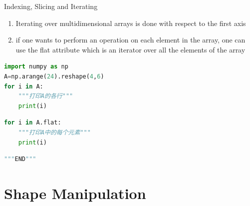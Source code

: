 \documentclass[ignorenonframetext,11pt,xcolor=dvipsnames,hyperref={colorlinks,allcolors=.,urlcolor=blue, citecolor=violet, bookmarksdepth=4},aspectratio=1610]{beamer}
\providecommand{\tightlist}{%
  \setlength{\itemsep}{0pt}\setlength{\parskip}{0pt}}
\begin{document}
\begin{frame}[fragile]{Indexing, Slicing and Iterating}
\protect\hypertarget{indexing-slicing-and-iterating-4}{}

\begin{enumerate}
\tightlist
\item
  Iterating over multidimensional arrays is done with respect to the
  first axis
\item
  if one wants to perform an operation on each element in the array, one
  can use the flat attribute which is an iterator over all the elements
  of the array
\end{enumerate}

\begin{lstlisting}[language=Python]
import numpy as np
A=np.arange(24).reshape(4,6)
for i in A:
    """打印A的各行"""
    print(i) 
\end{lstlisting}

\begin{lstlisting}[language=Python]
for i in A.flat:
    """打印A中的每个元素"""
    print(i)
\end{lstlisting}

\begin{lstlisting}[language=Python]
"""END"""
\end{lstlisting}

\end{frame}

\hypertarget{shape-manipulation}{%
\section{Shape Manipulation}\label{shape-manipulation}}
\end{document}
